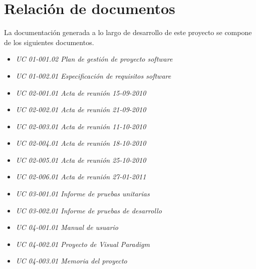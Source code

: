 \chapter{Relación de documentos}

La documentación generada a lo largo de desarrollo de este proyecto se compone
de los siguientes documentos.

\begin{itemize}
\item \textit{UC 01-001.02 Plan de gestión de proyecto software}
\item \textit{UC 01-002.01 Especificación de requisitos software}
\item \textit{UC 02-001.01 Acta de reunión 15-09-2010}
\item \textit{UC 02-002.01 Acta de reunión 21-09-2010}
\item \textit{UC 02-003.01 Acta de reunión 11-10-2010}
\item \textit{UC 02-004.01 Acta de reunión 18-10-2010}
\item \textit{UC 02-005.01 Acta de reunión 25-10-2010}
\item \textit{UC 02-006.01 Acta de reunión 27-01-2011}
\item \textit{UC 03-001.01 Informe de pruebas unitarias}
\item \textit{UC 03-002.01 Informe de pruebas de desarrollo}
\item \textit{UC 04-001.01 Manual de usuario}
\item \textit{UC 04-002.01 Proyecto de Visual Paradigm}
\item \textit{UC 04-003.01 Memoria del proyecto}
\end{itemize}
